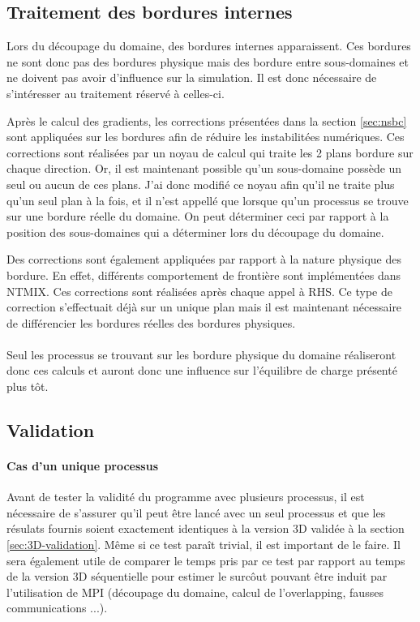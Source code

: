\subsection{Traitement des bordures internes}
Lors du découpage du domaine, des bordures internes apparaissent. Ces bordures ne sont donc pas des bordures physique mais des bordure entre sous-domaines et ne doivent pas avoir d'influence sur la simulation. Il est donc nécessaire de s'intéresser au traitement réservé à celles-ci. 

Après le calcul des gradients, les corrections présentées dans la section \ref{sec:nsbc} sont appliquées sur les bordures afin de réduire les instabilitées numériques. Ces corrections sont réalisées par un noyau de calcul qui traite les 2 plans bordure sur chaque direction. Or, il est maintenant possible qu'un sous-domaine possède un seul ou aucun de ces plans. J'ai donc modifié ce noyau afin qu'il ne traite plus qu'un seul plan à la fois, et il n'est appellé que lorsque qu'un processus se trouve sur une bordure réelle du domaine. On peut déterminer ceci par rapport à la position des sous-domaines qui a déterminer lors du découpage du domaine.

Des corrections sont également appliquées par rapport à la nature physique des bordure. En effet, différents comportement de frontière sont implémentées dans NTMIX. Ces corrections sont réalisées après chaque appel à RHS. Ce type de correction s'effectuait déjà sur un unique plan mais il est maintenant nécessaire de différencier les bordures réelles des bordures physiques.

\paragraph{}Seul les processus se trouvant sur les bordure physique du domaine réaliseront donc ces calculs et auront donc une influence sur l'équilibre de charge présenté plus tôt. 

\subsection{Validation}

\paragraph{Cas d'un unique processus}Avant de tester la validité du programme avec plusieurs processus, il est nécessaire de s'assurer qu'il peut être lancé avec un seul processus et que les résulats fournis soient exactement identiques à la version 3D validée à la section \ref{sec:3D-validation}. Même si ce test paraît trivial, il est important de le faire. Il sera également utile de comparer le temps pris par ce test par rapport au temps de la version 3D séquentielle pour estimer le surcôut pouvant être induit par l'utilisation de MPI (découpage du domaine, calcul de l'overlapping, fausses communications ...).

